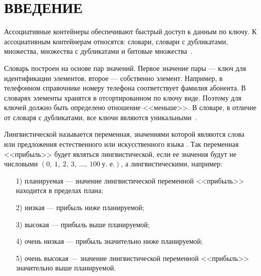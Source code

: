 {\centering \chapter*{ВВЕДЕНИЕ}}

Ассоциативные контейнеры обеспечивают быстрый доступ к данным по ключу. 
К ассоциативным контейнерам относятся: словари, словари с дубликатами, множества, множества с дубликатами и битовые \mbox{множества \cite{Shuikova2016}}. 

Словарь построен на основе пар значений. 
Первое значение пары --- ключ для идентификации элементов, второе --- собственно элемент. 
Например, в телефонном справочнике номеру телефона соответствует фамилия абонента. 
В словарях элементы хранятся в отсортированном по ключу виде. 
Поэтому для ключей должно быть определено отношение <<меньше>>. 
В словаре, в отличие от словаря с дубликатами, все ключи являются \mbox{уникальными \cite{Shuikova2016}}.

Лингвистической называется переменная, значениями которой являются слова или предложения естественного или искусственного языка \cite{Vasin2000}. 
Так переменная <<прибыль>> будет являться лингвистической, если ее значения будут не числовыми $(0,~1,~2,~3,~...,~100~\text{у.~е.})$, а лингвистическими, например:
\begin{enumerate}
\item[1)] планируемая --- значение лингвистической переменной <<прибыль>> находится в пределах плана;
\item[2)] низкая --- прибыль ниже планируемой;
\item[3)] высокая --- прибыль выше планируемой;
\item[4)] очень низкая --- прибыль значительно ниже планируемой;
\item[5)] очень высокая --- значение лингвистической переменной <<прибыль>> значительно выше планируемой.
\end{enumerate}
